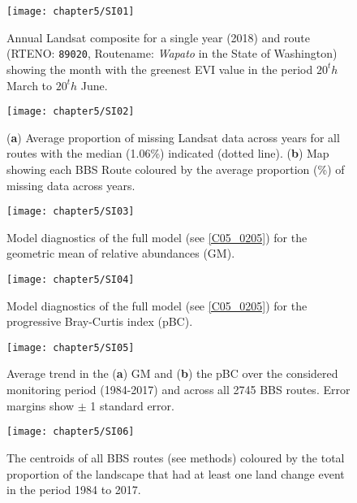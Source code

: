 \begin{figure}[htb]
\centering
\texttt{[image: chapter5/SI01]}
\caption{Annual Landsat composite for a single year (2018) and route (RTENO: \texttt{89020}, Routename: \textit{Wapato} in the State of Washington) showing the month with the greenest EVI value in the period $20^th$ March to $20^th$ June. }
\label{SI05_01}
\end{figure}

\begin{figure}[htb]
\centering
\texttt{[image: chapter5/SI02]}
\caption{(\textbf{a}) Average proportion of missing Landsat data across years for all routes with the median (1.06\%) indicated (dotted line). (\textbf{b}) Map showing each BBS Route coloured by the average proportion (\%) of missing data across years.}
\label{SI05_02}
\end{figure}

\begin{figure}[htb]
\centering
\texttt{[image: chapter5/SI03]}
\caption{Model diagnostics of the full model (see \ref{C05_0205}) for the geometric mean of relative abundances (GM).}
\label{SI05_03}
\end{figure}

\begin{figure}[htb]
\centering
\texttt{[image: chapter5/SI04]}
\caption{Model diagnostics of the full model (see \ref{C05_0205}) for the progressive Bray-Curtis index (pBC).}
\label{SI05_04}
\end{figure}

\begin{figure}[htb]
\centering
\texttt{[image: chapter5/SI05]}
\caption{Average trend in the (\textbf{a}) GM and (\textbf{b}) the pBC over the considered monitoring period (1984-2017) and across all 2745 BBS routes. Error margins show $\pm$ 1 standard error.}
\label{SI05_05}
\end{figure}

\begin{figure}[htb]
\centering
\texttt{[image: chapter5/SI06]}
\caption{The centroids of all BBS routes (see methods) coloured by the total proportion of the landscape that had at least one land change event in the period 1984 to 2017.}
\label{SI05_06}
\end{figure}

